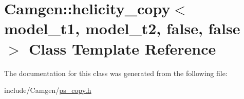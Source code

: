 \hypertarget{a00267}{}\section{Camgen\+:\+:helicity\+\_\+copy$<$ model\+\_\+t1, model\+\_\+t2, false, false $>$ Class Template Reference}
\label{a00267}


The documentation for this class was generated from the following file\+:\begin{DoxyCompactItemize}
\item 
include/\+Camgen/\hyperlink{a00740}{ps\+\_\+copy.\+h}\end{DoxyCompactItemize}
